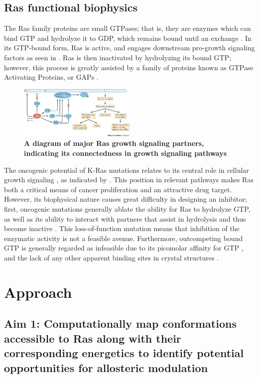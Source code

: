 \documentclass[12pt]{article}
\begin{document}
  \subsection*{Ras functional biophysics}
  The Ras family proteins are small GTPases; that is, they are enzymes which can bind GTP and hydrolyze it to GDP, which remains bound until an exchange \cite{pyla}. In its GTP-bound form, Ras is active, and engages downstream pro-growth signaling factors as seen in . Ras is then inactivated by hydrolyzing its bound GTP; however, this process is greatly assisted by a family of proteins known as GTPase Activating Proteins, or GAPs \cite{pyla}. 
    \begin{figure}[H]
  \centering
  \includegraphics[width=0.5\textwidth]{ras_signal.jpg}
  \caption{\textbf{A diagram of major Ras growth signaling partners, indicating its connectedness in growth signaling pathways} \cite{pyla}}
  \label{growthfig}
  \end{figure}
  The oncogenic potential of K-Ras mutations relates to its central role in cellular growth signaling \cite{pyla}, as indicated by . This position in relevant pathways makes Ras both a critical means of cancer proliferation and an attractive drug target. However, its biophysical nature causes great difficulty in designing an inhibitor; first, oncogenic mutations generally ablate the ability for Ras to hydrolyze GTP, as well as its ability to interact with partners that assist in hydrolysis and thus become inactive \cite{pyla}. This loss-of-function mutation means that inhibition of the enzymatic activity is not a feasible avenue. Furthermore, outcompeting bound GTP is generally regarded as infeasible due to its picomolar affinity for GTP \cite{ostrem2013} , and the lack of any other apparent  binding sites in crystal structures \cite{ostrem2013}.
  
  \section*{Approach}
  \subsection*{Aim 1: Computationally map conformations accessible to Ras along with their corresponding energetics to identify potential opportunities for allosteric modulation}
  
\end{document}
